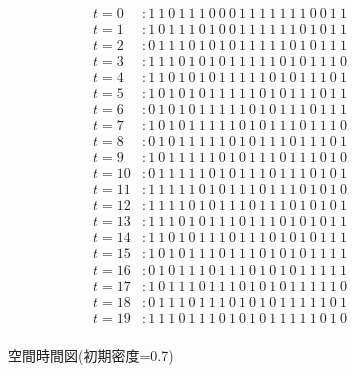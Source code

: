 \documentclass{jsarticle}
\begin{document}
\begin{figure}[htbp]
  \begin{align*}
    t = 0  & : 1 ~ 1 ~ 0 ~ 1 ~ 1 ~ 1 ~ 0 ~ 0 ~ 0 ~ 1 ~ 1 ~ 1 ~ 1 ~ 1 ~ 1 ~ 1 ~ 0 ~ 0 ~ 1 ~ 1 \\
    t = 1  & : 1 ~ 0 ~ 1 ~ 1 ~ 1 ~ 0 ~ 1 ~ 0 ~ 0 ~ 1 ~ 1 ~ 1 ~ 1 ~ 1 ~ 1 ~ 0 ~ 1 ~ 0 ~ 1 ~ 1 \\
    t = 2  & : 0 ~ 1 ~ 1 ~ 1 ~ 0 ~ 1 ~ 0 ~ 1 ~ 0 ~ 1 ~ 1 ~ 1 ~ 1 ~ 1 ~ 0 ~ 1 ~ 0 ~ 1 ~ 1 ~ 1 \\
    t = 3  & : 1 ~ 1 ~ 1 ~ 0 ~ 1 ~ 0 ~ 1 ~ 0 ~ 1 ~ 1 ~ 1 ~ 1 ~ 1 ~ 0 ~ 1 ~ 0 ~ 1 ~ 1 ~ 1 ~ 0 \\
    t = 4  & : 1 ~ 1 ~ 0 ~ 1 ~ 0 ~ 1 ~ 0 ~ 1 ~ 1 ~ 1 ~ 1 ~ 1 ~ 0 ~ 1 ~ 0 ~ 1 ~ 1 ~ 1 ~ 0 ~ 1 \\
    t = 5  & : 1 ~ 0 ~ 1 ~ 0 ~ 1 ~ 0 ~ 1 ~ 1 ~ 1 ~ 1 ~ 1 ~ 0 ~ 1 ~ 0 ~ 1 ~ 1 ~ 1 ~ 0 ~ 1 ~ 1 \\
    t = 6  & : 0 ~ 1 ~ 0 ~ 1 ~ 0 ~ 1 ~ 1 ~ 1 ~ 1 ~ 1 ~ 0 ~ 1 ~ 0 ~ 1 ~ 1 ~ 1 ~ 0 ~ 1 ~ 1 ~ 1 \\
    t = 7  & : 1 ~ 0 ~ 1 ~ 0 ~ 1 ~ 1 ~ 1 ~ 1 ~ 1 ~ 0 ~ 1 ~ 0 ~ 1 ~ 1 ~ 1 ~ 0 ~ 1 ~ 1 ~ 1 ~ 0 \\
    t = 8  & : 0 ~ 1 ~ 0 ~ 1 ~ 1 ~ 1 ~ 1 ~ 1 ~ 0 ~ 1 ~ 0 ~ 1 ~ 1 ~ 1 ~ 0 ~ 1 ~ 1 ~ 1 ~ 0 ~ 1 \\
    t = 9  & : 1 ~ 0 ~ 1 ~ 1 ~ 1 ~ 1 ~ 1 ~ 0 ~ 1 ~ 0 ~ 1 ~ 1 ~ 1 ~ 0 ~ 1 ~ 1 ~ 1 ~ 0 ~ 1 ~ 0 \\
    t = 10 & : 0 ~ 1 ~ 1 ~ 1 ~ 1 ~ 1 ~ 0 ~ 1 ~ 0 ~ 1 ~ 1 ~ 1 ~ 0 ~ 1 ~ 1 ~ 1 ~ 0 ~ 1 ~ 0 ~ 1 \\
    t = 11 & : 1 ~ 1 ~ 1 ~ 1 ~ 1 ~ 0 ~ 1 ~ 0 ~ 1 ~ 1 ~ 1 ~ 0 ~ 1 ~ 1 ~ 1 ~ 0 ~ 1 ~ 0 ~ 1 ~ 0 \\
    t = 12 & : 1 ~ 1 ~ 1 ~ 1 ~ 0 ~ 1 ~ 0 ~ 1 ~ 1 ~ 1 ~ 0 ~ 1 ~ 1 ~ 1 ~ 0 ~ 1 ~ 0 ~ 1 ~ 0 ~ 1 \\
    t = 13 & : 1 ~ 1 ~ 1 ~ 0 ~ 1 ~ 0 ~ 1 ~ 1 ~ 1 ~ 0 ~ 1 ~ 1 ~ 1 ~ 0 ~ 1 ~ 0 ~ 1 ~ 0 ~ 1 ~ 1 \\
    t = 14 & : 1 ~ 1 ~ 0 ~ 1 ~ 0 ~ 1 ~ 1 ~ 1 ~ 0 ~ 1 ~ 1 ~ 1 ~ 0 ~ 1 ~ 0 ~ 1 ~ 0 ~ 1 ~ 1 ~ 1 \\
    t = 15 & : 1 ~ 0 ~ 1 ~ 0 ~ 1 ~ 1 ~ 1 ~ 0 ~ 1 ~ 1 ~ 1 ~ 0 ~ 1 ~ 0 ~ 1 ~ 0 ~ 1 ~ 1 ~ 1 ~ 1 \\
    t = 16 & : 0 ~ 1 ~ 0 ~ 1 ~ 1 ~ 1 ~ 0 ~ 1 ~ 1 ~ 1 ~ 0 ~ 1 ~ 0 ~ 1 ~ 0 ~ 1 ~ 1 ~ 1 ~ 1 ~ 1 \\
    t = 17 & : 1 ~ 0 ~ 1 ~ 1 ~ 1 ~ 0 ~ 1 ~ 1 ~ 1 ~ 0 ~ 1 ~ 0 ~ 1 ~ 0 ~ 1 ~ 1 ~ 1 ~ 1 ~ 1 ~ 0 \\
    t = 18 & : 0 ~ 1 ~ 1 ~ 1 ~ 0 ~ 1 ~ 1 ~ 1 ~ 0 ~ 1 ~ 0 ~ 1 ~ 0 ~ 1 ~ 1 ~ 1 ~ 1 ~ 1 ~ 0 ~ 1 \\
    t = 19 & : 1 ~ 1 ~ 1 ~ 0 ~ 1 ~ 1 ~ 1 ~ 0 ~ 1 ~ 0 ~ 1 ~ 0 ~ 1 ~ 1 ~ 1 ~ 1 ~ 1 ~ 0 ~ 1 ~ 0 \\
  \end{align*}
  \caption{空間時間図(初期密度=0.7)}
  \label{fig:output3}
\end{figure}
\end{document}
